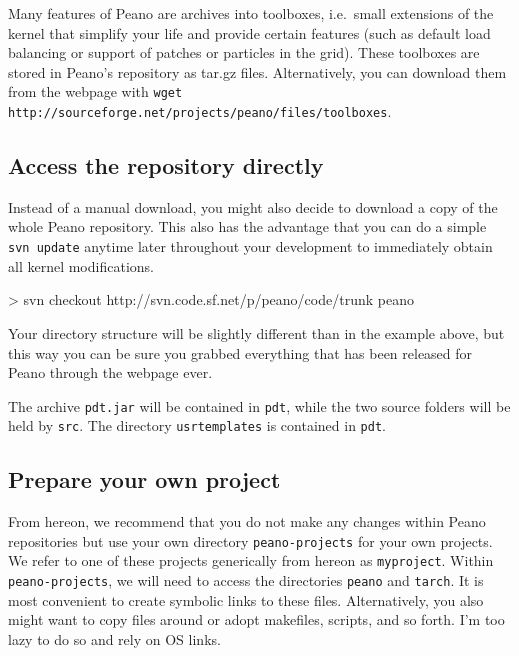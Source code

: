 \begin{remark}
 Many features of Peano are archives into toolboxes, i.e.~small extensions of
 the kernel that simplify your life and provide certain features (such as
 default load balancing or support of patches or particles in the grid). These
 toolboxes are stored in Peano's repository as tar.gz files. Alternatively, you
 can download them from the webpage with \linebreak
 \texttt{wget http://sourceforge.net/projects/peano/files/toolboxes}. 
\end{remark}


\subsection{Access the repository directly}

Instead of a manual download, you might also decide to download a copy of the
whole Peano repository. 
This also has the advantage that you can do a simple \texttt{svn update} anytime
later throughout your development to immediately obtain all kernel
modifications.


\begin{code}
> svn checkout http://svn.code.sf.net/p/peano/code/trunk peano
\end{code}

\noindent
Your directory structure will be slightly different than in the example above,
but this way you can be sure you grabbed everything that has been released for
Peano through the webpage ever.

The archive \texttt{pdt.jar} will be contained in \texttt{pdt}, while the two
source folders will be held by \texttt{src}.
The directory \texttt{usrtemplates} is contained in \texttt{pdt}.


\subsection{Prepare your own project}


From hereon, we recommend that you do not make any changes within Peano
repositories but use your own directory \texttt{peano-projects} for your own
projects.
We refer to one of these projects generically from hereon as \texttt{myproject}.
Within \texttt{peano-projects}, we will need to access the directories
\texttt{peano} and \texttt{tarch}.
It is most convenient to create symbolic links to these files.
Alternatively, you also might want to copy files around or adopt makefiles,
scripts, and so forth.
I'm too lazy to do so and rely on OS links.



